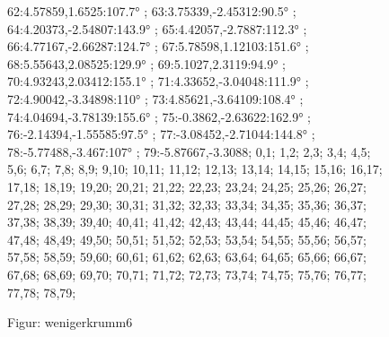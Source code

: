 \documentclass[a4paper,10pt,ngerman]{scrartcl}
\begin{document}
\begin{figure}[!h]
{            62:4.57859,1.6525:107.7° ;
            63:3.75339,-2.45312:90.5° ;
            64:4.20373,-2.54807:143.9° ;
            65:4.42057,-2.7887:112.3° ;
            66:4.77167,-2.66287:124.7° ;
            67:5.78598,1.12103:151.6° ;
            68:5.55643,2.08525:129.9° ;
            69:5.1027,2.3119:94.9° ;
            70:4.93243,2.03412:155.1° ;
            71:4.33652,-3.04048:111.9° ;
            72:4.90042,-3.34898:110° ;
            73:4.85621,-3.64109:108.4° ;
            74:4.04694,-3.78139:155.6° ;
            75:-0.3862,-2.63622:162.9° ;
            76:-2.14394,-1.55585:97.5° ;
            77:-3.08452,-2.71044:144.8° ;
            78:-5.77488,-3.467:107° ;
            79:-5.87667,-3.3088;
        }{
            0,1;
            1,2;
            2,3;
            3,4;
            4,5;
            5,6;
            6,7;
            7,8;
            8,9;
            9,10;
            10,11;
            11,12;
            12,13;
            13,14;
            14,15;
            15,16;
            16,17;
            17,18;
            18,19;
            19,20;
            20,21;
            21,22;
            22,23;
            23,24;
            24,25;
            25,26;
            26,27;
            27,28;
            28,29;
            29,30;
            30,31;
            31,32;
            32,33;
            33,34;
            34,35;
            35,36;
            36,37;
            37,38;
            38,39;
            39,40;
            40,41;
            41,42;
            42,43;
            43,44;
            44,45;
            45,46;
            46,47;
            47,48;
            48,49;
            49,50;
            50,51;
            51,52;
            52,53;
            53,54;
            54,55;
            55,56;
            56,57;
            57,58;
            58,59;
            59,60;
            60,61;
            61,62;
            62,63;
            63,64;
            64,65;
            65,66;
            66,67;
            67,68;
            68,69;
            69,70;
            70,71;
            71,72;
            72,73;
            73,74;
            74,75;
            75,76;
            76,77;
            77,78;
            78,79;
        }
        \caption{Figur: wenigerkrumm6}
        \label{fig:wenigerkrumm6}
    \end{figure}
    \newpage
\end{document}

